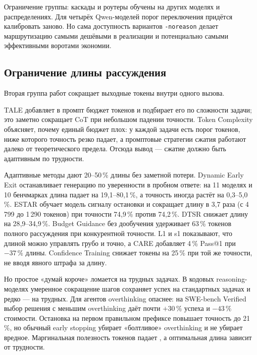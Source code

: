 \documentclass[11pt,a4paper]{article}
\newcommand{\code}[1]{\texttt{#1}}
\begin{document}
Ограничение группы: каскады и роутеры обучены на других моделях и
распределениях. Для четырёх Qwen-моделей порог переключения придётся
калибровать заново. Но сама доступность вариантов \code{-noreason} делает
маршрутизацию самыми дешёвыми в реализации и потенциально самыми
эффективными воротами экономии.

\subsection{Ограничение длины рассуждения}

Вторая группа работ сокращает выходные токены внутри одного вызова.

TALE \cite{han2024tokenbudget} добавляет в промпт бюджет токенов и
подбирает его по сложности задачи; это заметно сокращает CoT при небольшом
падении точности. Token Complexity \cite{lee2025wellllms} объясняет, почему
единый бюджет плох: у каждой задачи есть порог токенов, ниже которого
точность резко падает, а промптовые стратегии сжатия работают далеко от
теоретического предела. Отсюда вывод — сжатие должно быть адаптивным по
трудности.

Адаптивные методы дают 20--50\,\% длины без заметной потери. Dynamic Early
Exit \cite{yang2025dynamicearly} останавливает генерацию по уверенности в
пробном ответе: на 11 моделях и 10 бенчмарках длина падает на
19{,}1--80{,}1\,\%, а точность иногда растёт на 0{,}3--5{,}0\,\%. ESTAR
\cite{wang2026estarearly} обучает модель сигналу остановки и сокращает
длину в 3{,}7 раза (с 4\,799 до 1\,290 токенов) при точности 74{,}9\,\%
против 74{,}2\,\%. DTSR \cite{xiang2026thinkingenough} снижает длину на
28{,}9--34{,}9\,\%. Budget Guidance \cite{li2025steeringllm} без
дообучения удерживает 63\,\% токенов полного рассуждения при конкурентной
точности. L1 \cite{aggarwal2025l1controlling} и s1 \cite{muennighoff2025s1simple}
показывают, что длиной можно управлять грубо и точно, а CARE
\cite{he2026thinkor} добавляет 4\,\% Pass@1 при $-37\,\%$ длины. Confidence
Training \cite{hosseini2026learningstop} снижает токены на 25\,\% при той же
точности, не вводя явного штрафа за длину.

Но простое «думай короче» ломается на трудных задачах. В кодовых
reasoning-моделях \cite{xue2025empiricalstudy} умеренное сокращение шагов
сохраняет успех на стандартных задачах и редко — на трудных. Для агентов
overthinking опаснее: на SWE-bench Verified \cite{cuadron2025dangeroverthinking}
выбор решения с меньшим overthinking даёт почти $+30\,\%$ успеха и
$-43\,\%$ стоимости. Остановка на первом правильном префиксе
\cite{caldarella2026thinkingpast} повышает точность до 21\,\%, но обычный
early stopping убирает «болтливое» overthinking и не убирает вредное.
Маргинальная полезность токенов падает \cite{zhou2026thinkinghurts}, а
оптимальная длина зависит от трудности.
\end{document}
